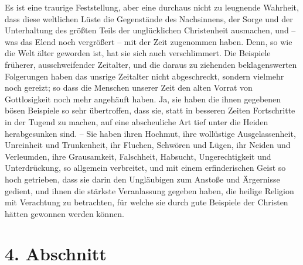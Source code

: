 Es ist eine traurige Feststellung, aber eine durchaus nicht zu leugnende
Wahrheit, dass diese weltlichen Lüste die Gegenstände des Nachsinnens, der Sorge
und der Unterhaltung des größten Teils der unglücklichen Christenheit ausmachen,
und -- was das Elend noch vergrößert -- mit der Zeit zugenommen haben. Denn, so
wie die Welt älter geworden ist, hat sie sich auch verschlimmert. Die Beispiele
früherer, ausschweifender Zeitalter, und die daraus zu ziehenden beklagenswerten
Folgerungen haben das unsrige Zeitalter nicht abgeschreckt, sondern vielmehr
noch gereizt; so dass die Menschen unserer Zeit den alten Vorrat von
Gottlosigkeit noch mehr angehäuft haben. Ja, sie haben die ihnen gegebenen bösen
Beispiele so sehr übertroffen, dass sie, statt in besseren Zeiten Fortschritte in
der Tugend zu machen, auf eine abscheuliche Art tief unter die Heiden
herabgesunken sind. --
Sie haben ihren Hochmut, ihre wollüstige
Ausgelassenheit, Unreinheit und Trunkenheit, ihr Fluchen, Schwören und Lügen,
ihr Neiden und Verleumden, ihre Grausamkeit, Falschheit, Habsucht,
Ungerechtigkeit und Unterdrückung, so allgemein verbreitet, und mit einem
erfinderischen Geist so hoch getrieben, dass sie darin den Ungläubigen zum
Anstoße und Ärgernisse gedient, und ihnen die stärkste Veranlassung gegeben
haben, die heilige Religion mit Verachtung zu betrachten, für welche sie durch
gute Beispiele der Christen hätten gewonnen werden können.

\section{4. Abschnitt} \label{kap1_ab4}

